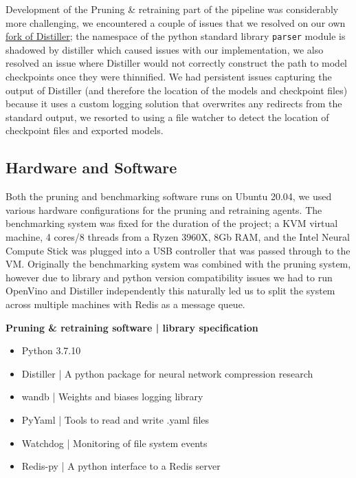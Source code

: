 \documentclass[../Dissertation.tex]{subfiles}
\begin{document}
Development of the Pruning \& retraining part of the pipeline was considerably more challenging, we encountered a couple of issues that we resolved on our own \href{https://github.com/friedforfun/distiller?organization=friedforfun&organization=friedforfun}{\underline{\color{blue}fork of Distiller}}; the namespace of the python standard library \texttt{parser} module is shadowed by distiller which caused issues with our implementation, we also resolved an issue where Distiller would not correctly construct the path to model checkpoints once they were thinnified.
We had persistent issues capturing the output of Distiller (and therefore the location of the models and checkpoint files) because it uses a custom logging solution that overwrites any redirects from the standard output, we resorted to using a file watcher to detect the location of checkpoint files and exported models.
 


\subsection{Hardware and Software}
Both the pruning and benchmarking software runs on Ubuntu 20.04, we used various hardware configurations for the pruning and retraining agents. 
The benchmarking system was fixed for the duration of the project; a KVM virtual machine, 4 cores/8 threads from a Ryzen 3960X, 8Gb RAM, and the Intel Neural Compute Stick was plugged into a USB controller that was passed through to the VM.
Originally the benchmarking system was combined with the pruning system, however due to library and python version compatibility issues we had to run OpenVino and Distiller independently this naturally led us to split the system across multiple machines with Redis as a message queue.


\noindent\textbf{Pruning \& retraining software | library specification}
\begin{itemize}
    \item Python 3.7.10
    \item Distiller | A python package for neural network compression research
    \item wandb | Weights and biases logging library
    \item PyYaml | Tools to read and write .yaml files
    \item Watchdog | Monitoring of file system events
    \item Redis-py | A python interface to a Redis server
\end{itemize}
\end{document}
